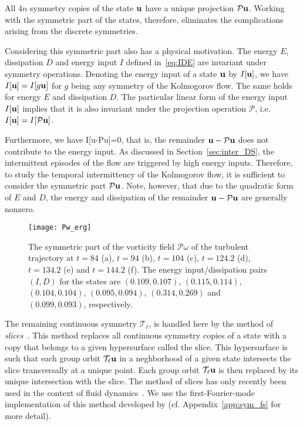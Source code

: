 \documentclass{jfm}
\begin{document}
All $4n$ symmetry copies of the state $\mathbf u$ have a unique projection $\mathcal P\mathbf
u$. Working with the symmetric part of the states, therefore, eliminates the complications
arising from the discrete symmetries.

Considering this symmetric part also has a physical
motivation. The energy $E$, dissipation $D$ and energy input $I$ defined in~\eqref{eq:IDE}
are invariant under symmetry operations. Denoting the energy input of a state $\mathbf u$
by $I[\mathbf u]$, we have $I[\mathbf u]=I[g\mathbf u]$ for $g$ being any symmetry of the Kolmogorov flow.
The same holds for energy $E$ and dissipation $D$. The particular linear form of the energy input $I[\mathbf u]$
implies that it is also invariant under the projection operation
$\mathcal P$, i.e. $I[\mathbf u]=I[\mathcal P\mathbf u]$.

Furthermore, we have
\beq
I[\vc u-\mathcal P\vc u]=0,
\label{eq:I_lin}
\eeq
that is, the remainder $\mathbf u-\mathcal P\mathbf u$ does not contribute to the energy input.
As discussed in Section~\ref{sec:inter_DS}, the intermittent episodes of the flow are triggered
by high energy inputs. Therefore, to study the temporal intermittency of the Kolmogorov flow, it is
sufficient to consider the symmetric part $\mathcal P\mathbf u$.
Note, however, that due to the quadratic form of $E$ and $D$,
the energy and dissipation of the remainder $\mathbf u-\mathcal P\mathbf u$
are generally nonzero.
%
\begin{figure}
\centering
\texttt{[image: Pw\_erg]}
\caption{The symmetric part of the vorticity field $\mathcal P\omega$
of the turbulent trajectory at
$t=84$ (a),
$t=94$ (b),
$t=104$ (c),
$t=124.2$ (d),
$t=134.2$ (e) and
$t=144.2$ (f).
The energy input/dissipation pairs $(I,D)$ for the states are
$(0.109,0.107)$,
$(0.115,0.114)$,
$(0.104,0.104)$,
$(0.095,0.094)$,
$(0.314,0.269)$ and
$(0.099,0.093)$, respectively.}
\label{fig:Pw_erg}
\end{figure}

The remaining continuous symmetry $\mathcal T_\ell$, is handled here by the method of
\emph{slices}~\citep{cartan35,field80,rowley03}.
This method replaces all continuous symmetry copies of a
state with a
copy that belongs to a given hypersurface called the slice. This hypersurface is such that each
group orbit $\mathcal T_\ell\mathbf u$
in a neghborhood of a given state
intersects the slice transversally at a unique point.
Each group orbit $\mathcal T_\ell\mathbf u$ is then replaced by its unique intersection with the slice.
The method of slices has only recently been used in the context of fluid
dynamics~\citep{ACHKW11,WSC15}.
We use the first-Fourier-mode implementation of this
method developed by (cf. Appendix~\ref{app:sym_fs} for more detail).
\end{document}
